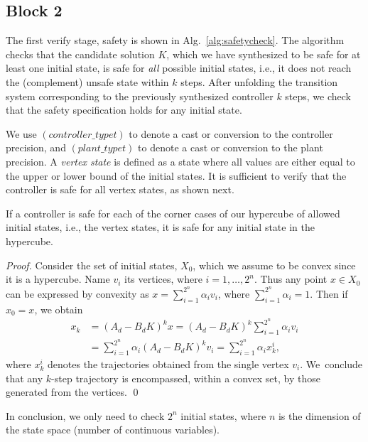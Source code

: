 \subsection{Block 2}

The first {\sc verify} stage, {\sc safety} is shown in Alg.~\ref{alg:safetycheck}. 
The algorithm checks that the candidate
solution $K$, which we have synthesized to be safe for at least one initial
state, is safe for \emph{all} possible initial states, i.e., it does not reach
the (complement) unsafe state within $k$ steps.  After unfolding the transition system corresponding
to the previously synthesized controller $k$ steps, we check that the safety
specification holds for any initial state. 

We use $(controller\_typet)$ to denote a
cast or conversion to the controller precision, and $(plant\_typet)$ to denote a cast or conversion to the 
plant precision. A \emph{vertex state} is defined as a state where all values are either equal to the upper or lower
bound of the initial states. It is sufficient to verify that the controller is safe for all vertex states, as shown next. 


\begin{theorem}
  \label{th:safety}
If a controller is safe for each of the corner cases of our hypercube of
allowed initial states, i.e., the vertex states, it is safe for any initial state in the hypercube. 
\end{theorem}
\begin{proof}
Consider the set of initial states, $X_0$, which we assume to be convex since it is a hypercube. 
Name $v_i$ its vertices, where $i=1,\ldots, 2^n$.  
Thus any point $x \in X_0$ can be expressed by convexity as $x = \sum_{i=1}^{2^n} \alpha_i v_i$, 
where $\sum_{i=1}^{2^n} \alpha_i =1$. Then if $x_0=x$, we obtain 
\begin{align*}
x_k   &= (A_d - B_d K)^k x = (A_d - B_d K)^k \sum_{i=1}^{2^n} \alpha_i v_i \\
      &= \sum_{i=1}^{2^n} \alpha_i (A_d - B_d K)^k v_i = \sum_{i=1}^{2^n} \alpha_i x_k^i, 
 \end{align*}     
%
where $x_k^i$ denotes the trajectories obtained from the single vertex
$v_i$.  We~conclude that any $k$-step trajectory is encompassed, within a
convex set, by those generated from the vertices. 
\qed
\end{proof}
In conclusion, we only need to check $2^n$ initial states, 
where $n$ is the dimension of the state space (number of continuous variables).

